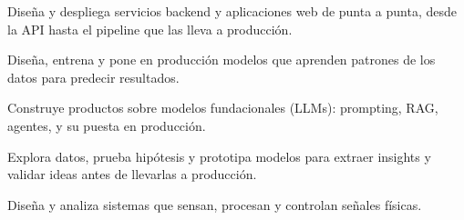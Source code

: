 {
Diseña y despliega servicios backend y aplicaciones web de punta a punta, desde la API hasta el pipeline que las lleva a producción.
\medskip

Diseña, entrena y pone en producción modelos que aprenden patrones de los datos para predecir resultados.
\medskip

Construye productos sobre modelos fundacionales (LLMs): prompting, RAG, agentes, y su puesta en producción.
\medskip

Explora datos, prueba hipótesis y prototipa modelos para extraer insights y validar ideas antes de llevarlas a producción.
\medskip

Diseña y analiza sistemas que sensan, procesan y controlan señales físicas.
\bigskip
}
